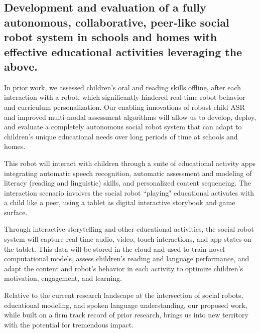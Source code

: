\subsection {Development and evaluation of a fully autonomous, collaborative, peer-like social robot system in schools and homes with effective educational activities leveraging the above.}

In prior work, we assessed children's oral and reading skills offline, after each interaction with a robot, which significantly hindered real-time robot behavior and curriculum personalization. Our enabling innovations of robust child ASR and improved multi-modal assessment algorithms will allow us to develop, deploy, and evaluate a completely autonomous social robot system that can adapt to children's unique educational needs over long periods of time at schools and homes.


This robot will interact with children through a suite of educational activity apps integrating automatic speech recognition, automatic assessment and modeling of literacy (reading and linguistic) skills, and personalized content sequencing. The interaction scenario involves the social robot ``playing" educational activates with a child like a peer, using a tablet as digital interactive storybook and game surface. 

Through interactive storytelling and other educational activities, the social robot system will capture real-time audio, video, touch interactions, and app states on the tablet. This data will be stored in the cloud and used to train novel computational models, assess children's reading and language performance, and adapt the content and robot's behavior in each activity to optimize children's motivation, engagement, and learning. 

Relative to the current research landscape at the intersection of social robots, educational modeling, and spoken language understanding, our proposed work, while built on a firm track record of prior research, brings us into new territory with the potential for tremendous impact.

